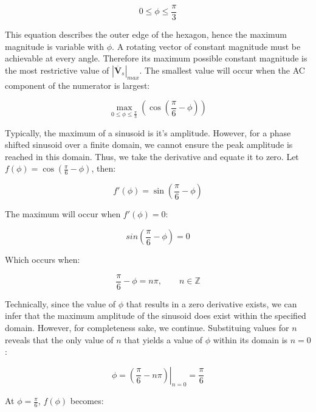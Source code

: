 \documentclass{article}
\begin{document}
\begin{equation}
    0 \leq \phi \leq \frac{\pi}{3}
\end{equation}

This equation describes the outer edge of the hexagon, hence the maximum magnitude is variable with $\phi$. A rotating vector of constant magnitude must be achievable at every angle. Therefore its maximum possible constant magnitude is the most restrictive value of $|\overline{\mathbf{V}}_s|_{max}$. The smallest value will occur when the AC component of the numerator is largest:

\begin{equation}
    \underset{0 \leq \phi \leq \frac{\pi}{3}}{\max}(\cos(\frac{\pi}{6} - \phi))
\end{equation}

Typically, the maximum of a sinusoid is it's amplitude. However, for a phase shifted sinusoid over a finite domain, we cannot ensure the peak amplitude is reached in this domain. Thus, we take the derivative and equate it to zero. Let $f(\phi) = \cos(\frac{\pi}{6} - \phi)$, then:

\begin{equation}
    f'(\phi) = \sin(\frac{\pi}{6} - \phi)
\end{equation}

The maximum will occur when $f'(\phi) = 0$:

\begin{equation}
    sin(\frac{\pi}{6} - \phi) = 0
\end{equation}

Which occurs when:

\begin{equation}
    \frac{\pi}{6} - \phi = n\pi, \qquad
    n \in \mathbb{Z}
\end{equation}

Technically, since the value of $\phi$ that results in a zero derivative exists, we can infer that the maximum amplitude of the sinusoid does exist within the specified domain. However, for completeness sake, we continue. Substituing values for $n$ reveals that the only value of $n$ that yields a value of $\phi$ within its domain is $n = 0$:

\begin{equation}
    \phi = \left.\left(\frac{\pi}{6} - n\pi\right)\right|_{n=0} = \frac{\pi}{6}
\end{equation}

At $\phi = \frac{\pi}{6}$, $f(\phi)$ becomes:
\end{document}
